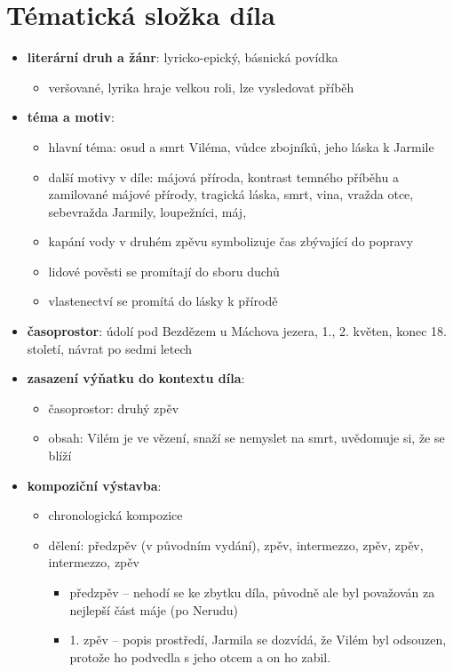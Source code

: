 \documentclass[10pt,a4paper]{article}
\begin{document}
\section*{Tématická složka díla}
\begin{itemize}
\item \textbf{literární druh a žánr}: lyricko-epický, básnická povídka
	\begin{itemize}
	\item veršované, lyrika hraje velkou roli, lze vysledovat příběh
	\end{itemize}
\item \textbf{téma a motiv}:
	\begin{itemize}
	\item hlavní téma: osud a smrt Viléma, vůdce zbojníků, jeho láska k Jarmile
	\item další motivy v díle: májová příroda, kontrast temného příběhu a zamilované májové přírody, tragická láska, smrt, vina,  vražda otce, sebevražda Jarmily, loupežníci, máj, 
	\item kapání vody v druhém zpěvu symbolizuje čas zbývající do popravy
	\item lidové pověsti se promítají do sboru duchů 
	\item vlastenectví se promítá do lásky k přírodě
	\end{itemize}
\item \textbf{časoprostor}: údolí pod Bezdězem u Máchova jezera, 1., 2. květen, konec 18. století, návrat po sedmi letech
\item \textbf{zasazení výňatku do kontextu díla}: 
	\begin{itemize}
	\item časoprostor: druhý zpěv
	\item obsah: Vilém je ve vězení, snaží se nemyslet na smrt, uvědomuje si, že se blíží
	\end{itemize}
\item \textbf{kompoziční výstavba}:
	\begin{itemize}
	\item chronologická kompozice
	\item dělení: předzpěv (v původním vydání), zpěv, intermezzo, zpěv, zpěv, intermezzo, zpěv
		\begin{itemize}
		\item předzpěv -- nehodí se ke zbytku díla, původně ale byl považován za nejlepší část máje (po Nerudu)
		\item 1. zpěv -- popis prostředí, Jarmila se dozvídá, že Vilém byl odsouzen, protože ho podvedla s jeho otcem a on ho zabil.

\end{itemize}
\end{itemize}
\end{itemize}
\end{document}
